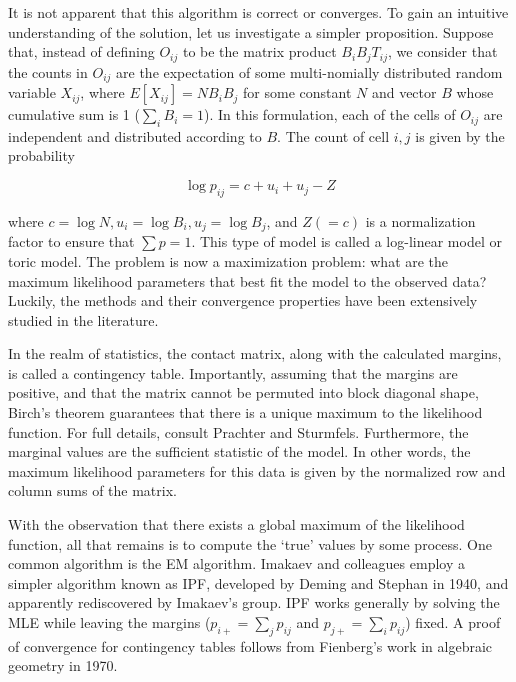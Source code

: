 It is not apparent that this algorithm is correct or converges.  To gain an intuitive understanding of the solution, let us investigate a
simpler proposition.  Suppose that, instead of defining $O_{ij}$ to be the matrix product $B_{i}B_{j}T_{ij}$, we consider that the counts
in $O_{ij}$ are the expectation of some multi-nomially distributed random variable $X_{ij}$, where $E[X_{ij}] = NB_{i}B_j$ for some
constant $N$ and vector $B$ whose cumulative sum is 1 ($\sum_{i}B_i = 1$).  In this formulation, each of the cells of $O_{ij}$ are
independent and distributed according to $B$.  The count of cell $i,j$ is given by the probability

\[
  \log{p_{ij}} =  c + u_i + u_j - Z
\]

where $c = \log{N}, u_i = \log{B_i}, u_j = \log{B_j}$, and $Z (=c)$ is a normalization factor to ensure that $\sum p = 1$.  This type of
model is called a \gls{log-linear model} or \gls{toric model}.  The problem is now a maximization problem: what are the maximum likelihood parameters
that best fit the model to the observed data?  Luckily, the methods and their convergence properties have been extensively studied in the
literature\cite{fienberg2012}\cite{pachter2005}.

In the realm of statistics, the contact matrix, along with the calculated margins, is called a \gls{contingency table}.  Importantly, assuming
that the margins are positive, and that the matrix cannot be permuted into block diagonal shape, Birch's theorem guarantees that there is a
unique maximum to the likelihood function\cite{pachter2005}.  For full details, consult Prachter and Sturmfels\cite{pachter2005}.  Furthermore,
the marginal values are the \gls{sufficient statistic} of the model.  In other words, the maximum likelihood parameters for this data is given
by the normalized row and column sums of the matrix\cite{pachter2005}.

With the observation that there exists a global maximum of the likelihood function, all that remains is to compute the `true' values by some
process.  One common algorithm is the \gls{EM} algorithm\cite{fuchs1982}.  Imakaev and colleagues employ a simpler algorithm known as \gls{IPF},
developed by Deming and Stephan in 1940, and apparently rediscovered by Imakaev's group\cite{deming1940}.  \gls{IPF} works generally by solving
the \gls{MLE} while leaving the margins ($p_{i+} = \sum_{j}p_{ij}$ and $p_{j+} = \sum_{i}p_{ij}$) fixed.  A proof of convergence for contingency
tables follows from Fienberg's work in algebraic geometry in 1970\cite{fienberg1970}.

